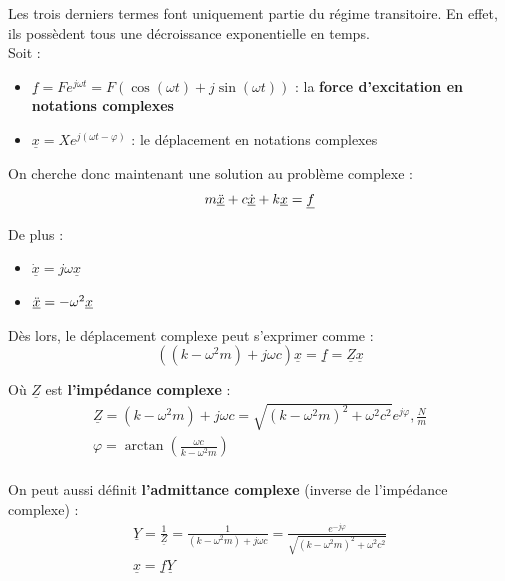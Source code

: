 \documentclass[../main.tex]{subfiles}
\begin{document}
Les trois derniers termes font uniquement partie du régime transitoire. En effet, ils possèdent tous une décroissance exponentielle en temps.\\

Soit : \begin{itemize}
    \item $\underline{f} = Fe^{j\omega t} = F(\cos(\omega t) + j\sin(\omega t))$ : la \textbf{force d'excitation en notations complexes}\\
    \item $\underline{x} = X e^{j(\omega t - \varphi)}$ : le déplacement en notations complexes\\
\end{itemize}

On cherche donc maintenant une solution au problème complexe : \begin{equation}
    m \underline{\Ddot{x}} + c \underline{\dot{x}} + k \underline{x} = \underline{f}
\end{equation}

De plus : \begin{itemize}
    \item $\underline{\dot{x}} = j \omega \underline{x}$\\
    \item $\underline{\Ddot{x}} = -\omega^2 \underline{x}$\\
\end{itemize}

Dès lors, le déplacement complexe peut s'exprimer comme : \begin{equation}
    ((k-\omega^2 m)+j \omega c)\underline{x} = \underline{f} = \underline{Z} \underline{x}
\end{equation}

Où $\underline{Z}$ est \textbf{l'impédance complexe} : \begin{equation}\begin{gathered}
    \underline{Z} = (k-\omega^2 m)+j \omega c = \sqrt{(k-\omega^2m)^2 + \omega^2 c^2}e^{j\varphi}, \frac{N}{m}\\
    \varphi = \arctan(\frac{\omega c}{k-\omega^2 m})\\
    \end{gathered}
\end{equation}

On peut aussi définit \textbf{l'admittance complexe} (inverse de l'impédance complexe) : \begin{equation}
    \begin{gathered}
        \underline{Y} = \frac{1}{\underline{Z}} = \frac{1}{(k-\omega^2 m)+j \omega c} = \frac{e^{-j\varphi}}{\sqrt{(k-\omega^2m)^2 + \omega^2 c^2}}\\
        \underline{x} = \underline{f} \underline{Y}\\
    \end{gathered}
\end{equation}
\end{document}
